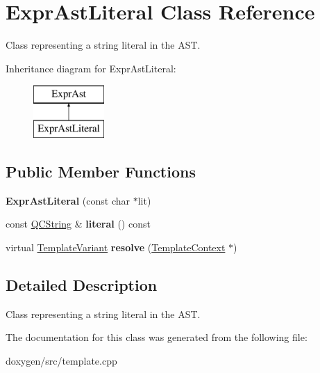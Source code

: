 \hypertarget{class_expr_ast_literal}{}\section{Expr\+Ast\+Literal Class Reference}
\label{class_expr_ast_literal}


Class representing a string literal in the A\+ST.  


Inheritance diagram for Expr\+Ast\+Literal\+:\begin{figure}[H]
\begin{center}
\leavevmode
\includegraphics[height=2.000000cm]{class_expr_ast_literal}
\end{center}
\end{figure}
\subsection*{Public Member Functions}
\begin{DoxyCompactItemize}
\item 
\mbox{\label{class_expr_ast_literal_a74510896ac7bfd3c7a326a3530db7734}} 
{\bfseries Expr\+Ast\+Literal} (const char $\ast$lit)
\item 
\mbox{\label{class_expr_ast_literal_a784738e105f7d0dfc03f2f410a5798b9}} 
const \mbox{\hyperlink{class_q_c_string}{Q\+C\+String}} \& {\bfseries literal} () const
\item 
\mbox{\label{class_expr_ast_literal_a92a3a59cc637c0f50aa25383e73ae44d}} 
virtual \mbox{\hyperlink{class_template_variant}{Template\+Variant}} {\bfseries resolve} (\mbox{\hyperlink{class_template_context}{Template\+Context}} $\ast$)
\end{DoxyCompactItemize}


\subsection{Detailed Description}
Class representing a string literal in the A\+ST. 

The documentation for this class was generated from the following file\+:\begin{DoxyCompactItemize}
\item 
doxygen/src/template.\+cpp\end{DoxyCompactItemize}
